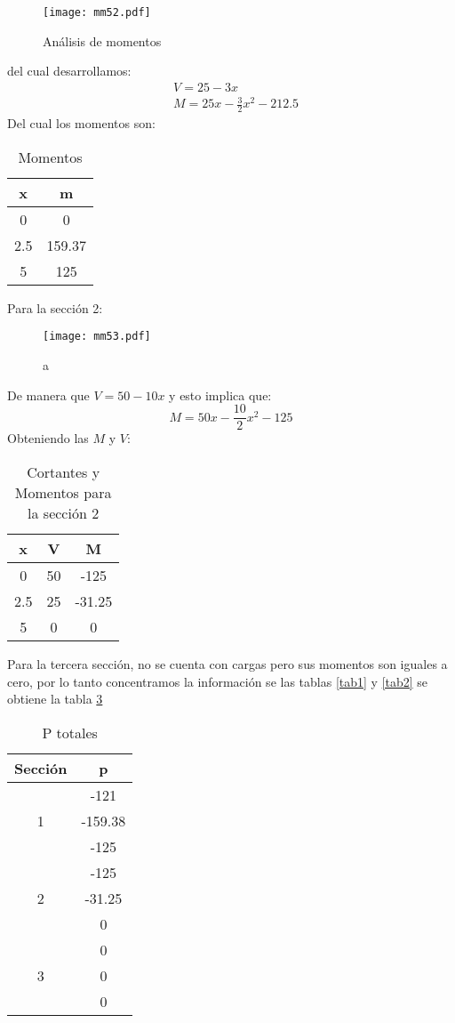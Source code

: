 \begin{figure}[h!]
\centering
  \texttt{[image: mm52.pdf]}
  \caption{Análisis de momentos}
  \label{mm52}
\end{figure}
del cual desarrollamos:
\begin{align*}
    &V=25-3x\\
    &M=25x-\frac{3}{2}x^2-212.5
\end{align*}
Del cual los momentos son:
\begin{table}[h!]
\centering
\begin{tabular}{@{}cc@{}}
\toprule
x   & m      \\ \midrule
0   & 0      \\
2.5 & 159.37 \\
5   & 125    \\ \bottomrule
\end{tabular}
\caption{Momentos}
\label{tabmm12}
\end{table}
Para la sección 2:
\begin{figure}[h!]
\centering
  \texttt{[image: mm53.pdf]}
  \caption{a}
  \label{mm533}
\end{figure}
De manera que $V=50-10x$ y esto implica que:
\begin{equation}
    M=50x-\frac{10}{2}x^2-125
\end{equation}
Obteniendo las $M$ y $V$:
\begin{table}[ht!]
\centering
\begin{tabular}{@{}ccc@{}}
\toprule
x   & V  & M      \\ \midrule
0   & 50 & -125   \\
2.5 & 25 & -31.25 \\
5   & 0  & 0      \\ \bottomrule
\end{tabular}
\caption{Cortantes y Momentos para la sección 2}
\label{tabmm13}
\end{table}
Para la tercera sección, no se cuenta con cargas pero sus momentos son iguales a cero, por lo tanto concentramos la información se las tablas \ref{tab1} y \ref{tab2} se obtiene la tabla \ref{tab3}
\begin{table}[h!]
\centering
\begin{tabular}{@{}cc@{}}
\toprule
Sección            & p       \\ \midrule
\multirow{3}{*}{1} & -121    \\
                   & -159.38 \\
                   & -125    \\
\multirow{3}{*}{2} & -125    \\
                   & -31.25  \\
                   & 0       \\
\multirow{3}{*}{3} & 0       \\
                   & 0       \\
                   & 0       \\ \cmidrule(l){2-2} 
\end{tabular}
\caption{P totales}
\label{tab3}
\end{table}
